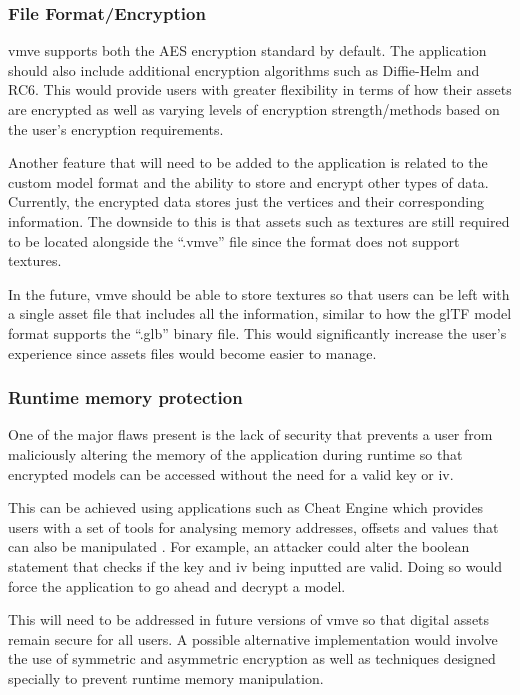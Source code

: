 \documentclass[11pt]{article}
\begin{document}
\subsubsection*{File Format/Encryption}
\gls*{vmve} supports both the AES encryption standard by default. The application
should also include additional encryption algorithms such as Diffie-Helm and
RC6. This would provide users with greater flexibility in terms of how their
assets are encrypted as well as varying levels of encryption strength/methods
based on the user's encryption requirements.

Another feature that will need to be added to the application is related to the
custom model format and the ability to store and encrypt other types of data.
Currently, the encrypted data stores just the vertices and their corresponding
information. The downside to this is that assets such as textures are still
required to be located alongside the ``.vmve'' file since the format does not
support textures.

In the future, \gls*{vmve} should be able to store textures so that users can be
left with a single asset file that includes all the information, similar to how
the glTF model format supports the ``.glb'' binary file. This would
significantly increase the user's experience since assets files would become
easier to manage.

\subsubsection*{Runtime memory protection}
One of the major flaws present is the lack of security that prevents a user from
maliciously altering the memory of the application during runtime so that
encrypted models can be accessed without the need for a valid key or iv.

This can be achieved using applications such as Cheat Engine which provides
users with a set of tools for analysing memory addresses, offsets and values
that can also be manipulated \cite{cheat_engine}. For example, an attacker could
alter the boolean statement that checks if the key and iv being inputted are
valid. Doing so would force the application to go ahead and decrypt a model.

This will need to be addressed in future versions of \gls*{vmve} so that digital
assets remain secure for all users. A possible alternative implementation would
involve the use of symmetric and asymmetric encryption as well as techniques
designed specially to prevent runtime memory manipulation.
\end{document}
